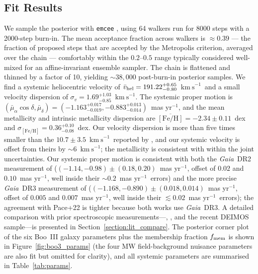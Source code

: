 \documentclass[twocolumn]{aastex631}
\newcommand{\gaia}{\textit{Gaia}\xspace}
\newcommand{\vlosUnits}{$\mathrm{km~s}^{-1}$\xspace}
\newcommand{\pmUnits}{mas yr$^{-1}$\xspace}
\begin{document}
\subsection{Fit Results}
We sample the posterior with \texttt{emcee} \citep{emcee}, using 64 walkers run for 8000 steps with a 2000-step burn-in. The mean acceptance fraction across walkers is $\approx 0.39$ --- the fraction of proposed steps that are accepted by the Metropolis criterion, averaged over the chain --- comfortably within the $0.2$--$0.5$ range typically considered well-mixed for an affine-invariant ensemble sampler. The chain is flattened and thinned by a factor of 10, yielding $\sim 38{,}000$ post-burn-in posterior samples.
We find a systemic heliocentric velocity of $\bar v_{\rm hel} = 191.22^{+0.65}_{-0.80}$~\vlosUnits\ and a small velocity dispersion of $\sigma_v = 1.69^{+1.03}_{-0.85}$~\vlosUnits.
The systemic proper motion is $(\bar\mu_\alpha\cos\delta, \bar\mu_\delta) = (-1.163^{+0.017}_{-0.019}, -0.883^{+0.013}_{-0.014})$~\pmUnits, and the mean metallicity and intrinsic metallicity dispersion are $\overline{[\mathrm{Fe/H}]} = -2.34 \pm 0.11$~dex and $\sigma_{[\mathrm{Fe/H}]} = 0.36^{+0.10}_{-0.08}$~dex.
Our velocity dispersion is more than five times smaller than the $10.7 \pm 3.5$~\vlosUnits\ reported by \citet{Carlin2018}, and our systemic velocity is offset from theirs by $\sim 6$~\vlosUnits; the metallicity is consistent with \citet{Carlin2018} within the joint uncertainties.  Our systemic proper motion is consistent with both the \gaia~DR2 measurement of \citet{Carlin2018} ($(-1.14, -0.98) \pm (0.18, 0.20)$~\pmUnits, offset of $0.02$ and $0.10$~\pmUnits, well inside their $\sim 0.2$~\pmUnits\ errors) and the more precise \gaia~DR3 measurement of \citet{Pace2022} ($(-1.168, -0.890) \pm (0.018, 0.014)$~\pmUnits, offset of $0.005$ and $0.007$~\pmUnits, well inside their $\lesssim 0.02$~\pmUnits\ errors); the agreement with Pace+22 is tighter because both works use \gaia\ DR3. A detailed comparison with prior spectroscopic measurements---\citet{Carlin2009}, \citet{Carlin2018}, and the recent \citet{Geha2026} DEIMOS sample---is presented in Section~\ref{section:lit_compare}.
The posterior corner plot of the six Boo~III galaxy parameters plus the membership fraction $f_{\rm mem}$ is shown in Figure~\ref{fig:boo3_params} (the four MW field-background nuisance parameters are also fit but omitted for clarity), and all systemic parameters are summarised in Table~\ref{tab:params}.
\end{document}
